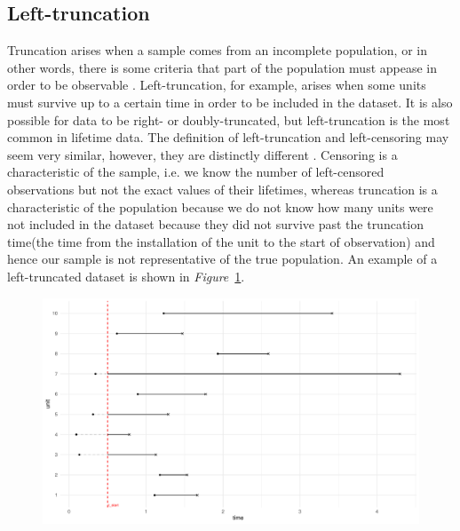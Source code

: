 \subsection{Left-truncation}

Truncation arises when a sample comes from an incomplete population, or in other words, there is some criteria that part of the population must appease in order to be observable \citep{guo1993}. Left-truncation, for example, arises when some units must survive up to a certain time in order to be included in the dataset. It is also possible for data to be right- or doubly-truncated, but left-truncation is the most common in lifetime data. The definition of left-truncation and left-censoring may seem very similar, however, they are distinctly different \citep{mitra2013}. Censoring is a characteristic of the sample, i.e. we know the number of left-censored observations but not the exact values of their lifetimes, whereas truncation is a characteristic of the population because we do not know how many units were not included in the dataset because they did not survive past the truncation time(the time from the installation of the unit to the start of observation) and hence our sample is not representative of the true population. An example of a left-truncated dataset is shown in \textit{Figure}~\ref{fig:left_trunc_example}. 

\begin{figure}[h]
    \centering
    \includegraphics[width=1\textwidth]{./figures/left_truncation_example.pdf}
    \caption{}
    \label{fig:left_trunc_example}
\end{figure}

